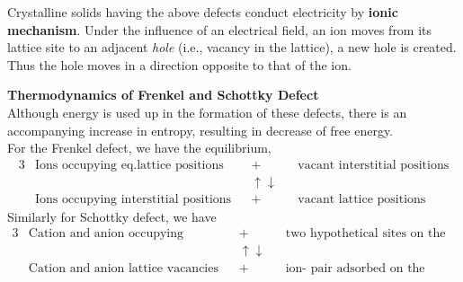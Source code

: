 \begin{note}
	Crystalline solids having the above defects conduct electricity by \textbf{ionic mechanism}. Under the influence of an electrical field, an ion moves from its lattice site to an adjacent \textit{hole} (i.e., vacancy in the lattice), a new hole is created. Thus the hole moves in a direction opposite to that of the ion.
\end{note}
\textbf{Thermodynamics of Frenkel and Schottky Defect}\\
Although energy is used up in the formation of these defects, there is an accompanying increase in entropy, resulting in decrease of free energy. \\
For the Frenkel defect, we have the equilibrium, \\
\begin{alignat*}{3}
&\text{Ions occupying eq.lattice positions }&&+ \quad && \text{vacant interstitial positions}\\
&\left. \right. && \uparrow \downarrow && \left. \right. \\
&\text{Ions occupying interstitial positions} &&+ \quad && \text{vacant lattice positions}
\end{alignat*}
Similarly for Schottky defect, we have\\
\begin{alignat*}{3}
&\text{Cation and anion occupying normal lattice positions}&&+ \quad && \text{two hypothetical sites on the crystal surface}\\
&\left. \right. && \uparrow \downarrow && \left. \right. \\
&\text{Cation and anion lattice vacancies} &&+ \quad && \text{ion- pair adsorbed on the surface}
\end{alignat*}
